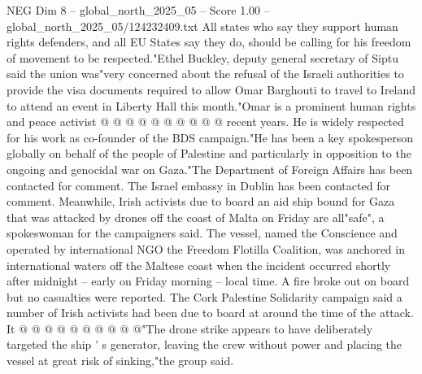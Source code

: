 \begin{textsample}{NEG Dim 8 – global\_north\_2025\_05 – Score 1.00 – global\_north\_2025\_05/124232409.txt}
All states who say they support human rights defenders, and all EU States say they do, should be calling for his freedom of movement to be respected."Ethel Buckley, deputy general secretary of Siptu said the union was"very concerned about the refusal of the Israeli authorities to provide the visa documents required to allow Omar Barghouti to travel to Ireland to attend an event in Liberty Hall this month."Omar is a prominent human rights and peace activist @ @ @ @ @ @ @ @ @ @ recent years.
He is widely respected for his work as co-founder of the BDS campaign."He has been a key spokesperson globally on behalf of the people of Palestine and particularly in opposition to the ongoing and genocidal war on Gaza."The Department of Foreign Affairs has been contacted for comment.
The Israel embassy in Dublin has been contacted for comment.
Meanwhile, Irish activists due to board an aid ship bound for Gaza that was attacked by drones off the coast of Malta on Friday are all"safe", a spokeswoman for the campaigners said.
The vessel, named the Conscience and operated by international NGO the Freedom Flotilla Coalition, was anchored in international waters off the Maltese coast when the incident occurred shortly after midnight -- early on Friday morning -- local time.
A fire broke out on board but no casualties were reported.
The Cork Palestine Solidarity campaign said a number of Irish activists had been due to board at around the time of the attack.
It @ @ @ @ @ @ @ @ @ @"The drone strike appears to have deliberately targeted the ship ' s generator, leaving the crew without power and placing the vessel at great risk of sinking,"the group said.

\end{textsample}

